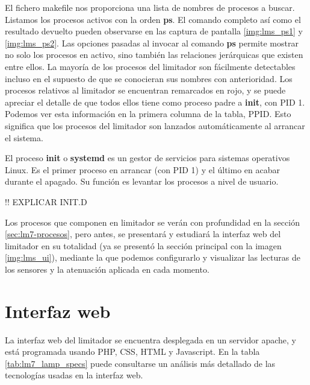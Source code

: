 El fichero \gls{makefile} nos proporciona una lista de nombres de procesos a buscar. Listamos los procesos activos con la orden \textbf{ps}. El comando completo así como el resultado devuelto pueden observarse en las captura de pantalla \ref{img:lms_ps1} y \ref{img:lms_ps2}. Las opciones pasadas al invocar al comando \textbf{ps} permite mostrar no solo los procesos en activo, sino también las relaciones jerárquicas que existen entre ellos. La mayoría de los procesos del limitador son fácilmente detectables incluso en el supuesto de que se conocieran sus nombres con anterioridad. Los procesos relativos al limitador se encuentran remarcados en rojo, y se puede apreciar el detalle de que todos ellos tiene como proceso padre  a \textbf{init}, con \acrshort{PID} 1. Podemos ver esta información en la primera columna de la tabla, \acrshort{PPID}. Esto significa que los procesos del limitador son lanzados automáticamente al arrancar el sistema.

\begin{shaded}
    \noindent
    El proceso \textbf{init} o \textbf{systemd} es un gestor de servicios para sistemas operativos Linux. Es el primer proceso en arrancar (con \acrshort{PID} 1) y el último en acabar durante el apagado. Su función es levantar los procesos a nivel de usuario.
\end{shaded}

!! EXPLICAR INIT.D

Los procesos que componen en limitador se verán con profundidad en la sección \ref{sec:lm7-procesos}, pero antes, se presentará y estudiará la interfaz web del limitador en su totalidad (ya se presentó la sección principal con la imagen \ref{img:lms_ui}), mediante la que podemos configurarlo y visualizar las lecturas de los sensores y la atenuación aplicada en cada momento.

\section{Interfaz web}

La interfaz web del limitador se encuentra desplegada en un servidor \gls{apache}, y está programada usando PHP, \acrshort{CSS}, HTML y Javascript. En la tabla \ref{tab:lm7_lamp_specs} puede consultarse un análisis más detallado de las tecnologías usadas en la interfaz web.

